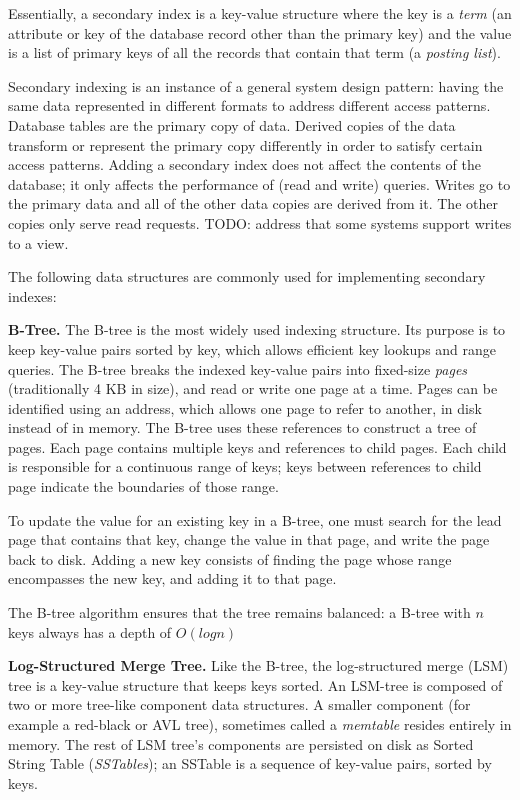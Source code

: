 Essentially, a secondary index is a key-value structure where the key is a \textit{term} (an attribute or key of the
database record other than the primary key) and the
value is a list of primary keys of all the records that contain that term (a \textit{posting list}).

Secondary indexing is an instance of a general system design pattern:
having the same data represented in different formats to address different access patterns.
Database tables are the primary copy of data.
Derived copies of the data transform or represent the primary copy differently in order to satisfy certain access patterns.
Adding a secondary index does not affect the contents of the database; it only affects the performance of (read and write)
queries.
Writes go to the primary data and all of the other data copies are derived from it.
The other copies only serve read requests.
TODO: address that some systems support writes to a view.

The following data structures are commonly used for implementing secondary indexes:

\medskip
\noindent
\textbf{B-Tree.}
The B-tree is the most widely used indexing structure.
Its purpose is to keep key-value pairs sorted by key, which allows efficient key lookups and range queries.
The B-tree breaks the indexed key-value pairs into fixed-size  \textit{pages} (traditionally 4 KB in size),
and read or write one page at a time.
Pages can be identified using an address, which allows one page to refer to another, in disk instead of in memory.
The B-tree uses these references to construct a tree of pages.
Each page contains multiple keys and references to child pages.
Each child is responsible for a continuous range of keys; keys between references to child page indicate the boundaries
of those range.

To update the value for an existing key in a B-tree, one must search for the lead page that contains that key,
change the value in that page, and write the page back to disk.
Adding a new key consists of finding the page whose range encompasses the new key, and adding it to that page.

The B-tree algorithm ensures that the tree remains balanced: a B-tree with $n$ keys always has a depth of $O(log n)$

\medskip
\noindent
\textbf{Log-Structured Merge Tree.}
Like the B-tree, the log-structured merge (LSM) tree is a key-value structure that keeps keys sorted.
An LSM-tree is composed of two or more tree-like component data structures.
A smaller component (for example a red-black or AVL tree), sometimes called a \textit{memtable} resides entirely in
memory.
The rest of LSM tree's components are persisted on disk as Sorted String Table (\textit{SSTables}); an SSTable is a
sequence of key-value pairs, sorted by keys.

